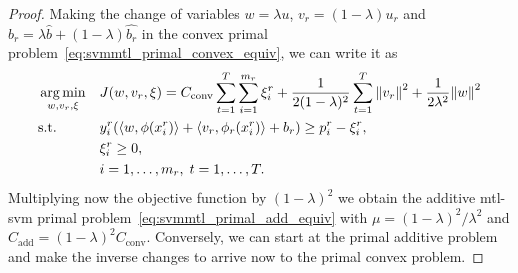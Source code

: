 \begin{proof}
    Making the change of variables $w = \lambda u$, $v_r = (1 - \lambda)u_r$ and $b_r = \lambda \hat{b} + (1 - \lambda) \hat{b_r}$ in the convex primal problem~\eqref{eq:svmmtl_primal_convex_equiv}, we can write it as 
        \begin{equation*}
            \begin{aligned}
            & \operatorname*{arg\min}_{w, v_r, \xi}
            & & {J(w, v_r, \xi) = C_\text{conv} \sum_{t= 1}^T \sum_{i=1}^{m_r}{\xi_{i}^r} + \frac{1}{2 (1-\lambda)^2} \sum_{t= 1}^T{\left\lVert v_r\right\rVert^2} + \frac{1}{2 \lambda^2} {\left\lVert w\right\rVert}^2} \\
            & \text{s.t.}
            & & y_{i}^r (\left\langle w, \phi(x_{i}^r) \right\rangle  + \left\langle v_r, \phi_r(x_{i}^r) \right\rangle + b_r) \geq p_{i}^r - \xi_{i}^r , \\
            & & & \xi_{i}^r \geq 0,  \\
            & & & i=1,\dotsc,m_r, \;  t= 1,\dotsc,T .
            \end{aligned}
        \end{equation*}
    Multiplying now the objective function by $(1 - \lambda)^2$ we obtain the additive \acrshort{mtl}-\acrshort{svm} primal problem~\eqref{eq:svmmtl_primal_add_equiv} with $\mu =(1 - \lambda)^2 / \lambda^2$ and $C_\text{add} = (1-\lambda)^2 C_\text{conv}$.
    Conversely, we can start at the primal additive problem and make the inverse changes to arrive now to the primal convex problem.
\end{proof}

